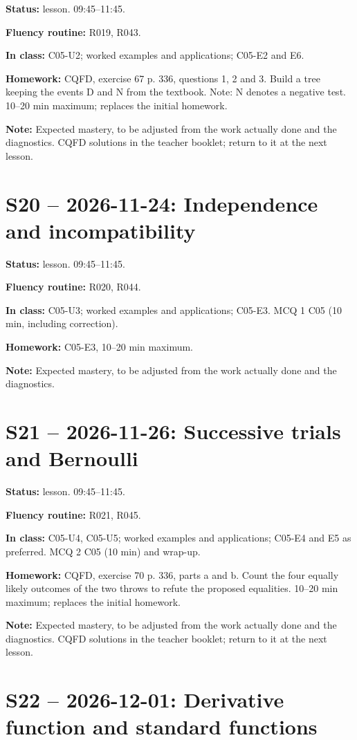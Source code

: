 \textbf{Status:} lesson. 09:45–11:45.\par\textbf{Fluency routine:} R019, R043.\par\textbf{In class:} C05-U2; worked examples and applications; C05-E2 and E6. \par\textbf{Homework:} CQFD, exercise 67 p. 336, questions 1, 2 and 3. Build a tree keeping the events D and N from the textbook. Note: N denotes a negative test. 10–20 min maximum; replaces the initial homework.\par\textbf{Note:} Expected mastery, to be adjusted from the work actually done and the diagnostics. CQFD solutions in the teacher booklet; return to it at the next lesson.
\section*{S20 -- 2026-11-24: Independence and incompatibility}
\textbf{Status:} lesson. 09:45–11:45.\par\textbf{Fluency routine:} R020, R044.\par\textbf{In class:} C05-U3; worked examples and applications; C05-E3.  MCQ 1 C05 (10 min, including correction).\par\textbf{Homework:} C05-E3, 10–20 min maximum.\par\textbf{Note:} Expected mastery, to be adjusted from the work actually done and the diagnostics.
\section*{S21 -- 2026-11-26: Successive trials and Bernoulli}
\textbf{Status:} lesson. 09:45–11:45.\par\textbf{Fluency routine:} R021, R045.\par\textbf{In class:} C05-U4, C05-U5; worked examples and applications; C05-E4 and E5 as preferred.  MCQ 2 C05 (10 min) and wrap-up.\par\textbf{Homework:} CQFD, exercise 70 p. 336, parts a and b. Count the four equally likely outcomes of the two throws to refute the proposed equalities. 10–20 min maximum; replaces the initial homework.\par\textbf{Note:} Expected mastery, to be adjusted from the work actually done and the diagnostics. CQFD solutions in the teacher booklet; return to it at the next lesson.
\section*{S22 -- 2026-12-01: Derivative function and standard functions}
